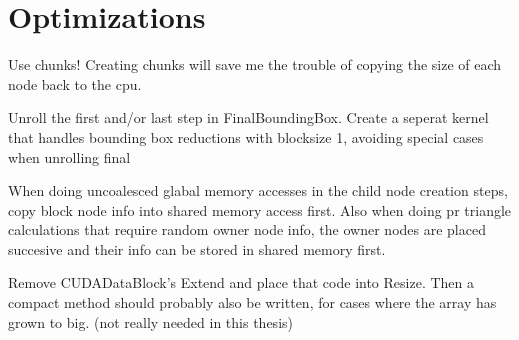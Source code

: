 \chapter{Optimizations}

Use chunks! Creating chunks will save me the trouble of copying the
size of each node back to the cpu.

Unroll the first and/or last step in FinalBoundingBox. Create a
seperat kernel that handles bounding box reductions with blocksize 1,
avoiding special cases when unrolling final

When doing uncoalesced glabal memory accesses in the child node
creation steps, copy block node info into shared memory access first.
Also when doing pr triangle calculations that require random owner
node info, the owner nodes are placed succesive and their info can be
stored in shared memory first.

Remove CUDADataBlock's Extend and place that code into Resize. Then a
compact method should probably also be written, for cases where the
array has grown to big. (not really needed in this thesis)
